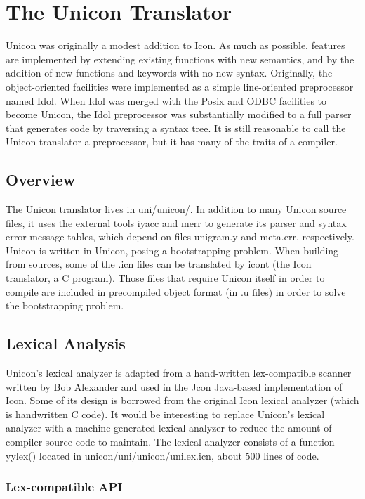 \chapter{The Unicon Translator}

Unicon was originally a modest addition to Icon. As much as possible,
features are implemented by extending existing functions with new
semantics, and by the addition of new functions and keywords with no
new syntax. Originally, the object-oriented facilities were
implemented as a simple line-oriented preprocessor named Idol.  When
Idol was merged with the Posix and ODBC facilities to become Unicon,
the Idol preprocessor was substantially modified to a full parser that
generates code by traversing a syntax tree. It is still reasonable to
call the Unicon translator a preprocessor, but it has many of the
traits of a compiler.


\section{Overview}

The Unicon translator lives in uni/unicon/. In addition to many Unicon
source files, it uses the external tools iyacc and merr to generate
its parser and syntax error message tables, which depend on files
unigram.y and meta.err, respectively. Unicon is written in Unicon,
posing a bootstrapping problem. When building from sources, some of
the .icn files can be translated by icont (the Icon translator, a C
program). Those files that require Unicon itself in order to compile
are included in precompiled object format (in .u files) in order to
solve the bootstrapping problem.

\section{Lexical Analysis}

Unicon's lexical analyzer is adapted from a hand-written lex-compatible
scanner written by Bob Alexander and used in the Jcon Java-based
implementation of Icon. Some of its design is borrowed from the
original Icon lexical analyzer (which is handwritten C code). It would
be interesting to replace Unicon's lexical analyzer with a machine
generated lexical analyzer to reduce the amount of compiler source
code to maintain. The lexical analyzer consists of a function
yylex() located in unicon/uni/unicon/unilex.icn, about 500 lines of
code.

\subsection{Lex-compatible API}

